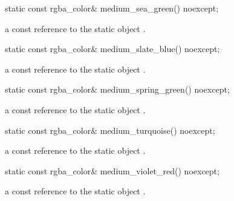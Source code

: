 \begin{itemdecl}
static const rgba_color& medium_sea_green() noexcept;
\end{itemdecl}
\begin{itemdescr}
\pnum
\returns
a const reference to the static  object .
\end{itemdescr}

\begin{itemdecl}
static const rgba_color& medium_slate_blue() noexcept;
\end{itemdecl}
\begin{itemdescr}
\pnum
\returns
a const reference to the static  object .
\end{itemdescr}

\begin{itemdecl}
static const rgba_color& medium_spring_green() noexcept;
\end{itemdecl}
\begin{itemdescr}
\pnum
\returns
a const reference to the static  object .
\end{itemdescr}

\begin{itemdecl}
static const rgba_color& medium_turquoise() noexcept;
\end{itemdecl}
\begin{itemdescr}
\pnum
\returns
a const reference to the static  object .
\end{itemdescr}

\begin{itemdecl}
static const rgba_color& medium_violet_red() noexcept;
\end{itemdecl}
\begin{itemdescr}
\pnum
\returns
a const reference to the static  object .
\end{itemdescr}

